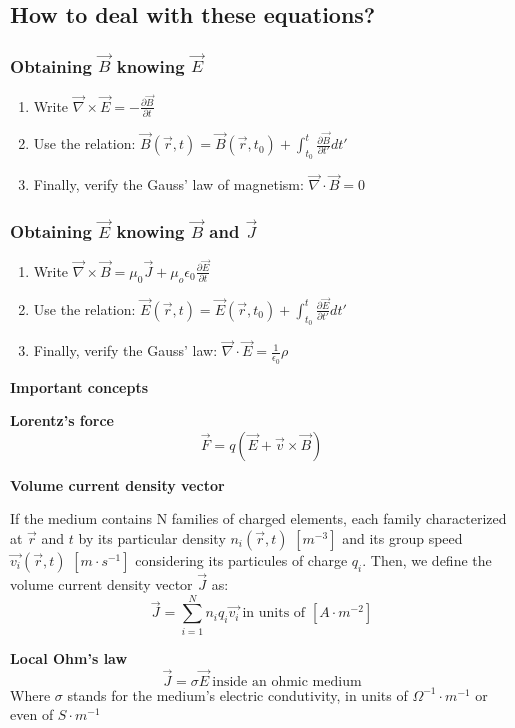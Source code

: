 \documentclass[11pt]{article}
\theoremstyle{definition}
\begin{document}
\subsection{How to deal with these equations?}
\subsubsection{Obtaining $\vec{B}$ knowing $\vec{E}$}
\begin{enumerate}[label=(\roman*)]
    \item Write $\vec{\nabla} \times \vec{E} = -\frac{\partial \vec{B}}{\partial t}$
    \item Use the relation: $\vec{B}(\vec{r},t) = \vec{B}(\vec{r},t_0) + \int_{t_0}^{t} \frac{\partial \vec{B}}{\partial t'}dt'$
    \item Finally, verify the Gauss' law of magnetism: $\vec{\nabla} \cdot \vec{B} = 0$
\end{enumerate}

\subsubsection{Obtaining $\vec{E}$ knowing $\vec{B}$ and $\vec{J}$}
\begin{enumerate}[label=(\roman*)]
    \item Write $\vec{\nabla} \times \vec{B} = \mu_0 \vec{J} + \mu_o \epsilon_0 \frac{\partial \vec{E}}{\partial t}$
    \item Use the relation: $\vec{E}(\vec{r},t) = \vec{E}(\vec{r},t_0) + \int_{t_0}^{t} \frac{\partial \vec{E}}{\partial t'}dt'$
    \item Finally, verify the Gauss' law: $\vec{\nabla} \cdot \vec{E} = \frac{1}{\epsilon_{0}}\rho$
\end{enumerate}

\begin{shaded}
\textbf{Important concepts}

    \textbf{Lorentz's force}
    \begin{equation}
        \vec{F} = q\left(\vec{E}+\vec{v} \times \vec{B}\right)
    \end{equation}

    \textbf{Volume current density vector}
    
    If the medium contains N families of charged elements, each family characterized at $\vec{r}$ and $t$ by its particular
    density $n_{i}\left(\vec{r},t\right)$ $[m^{-3}]$ and its group speed $\vec{v_{i}}(\vec{r},t)$ $[m\cdot s^{-1}]$ considering its particules of charge $q_{i}$.
    Then, we define the volume current density vector $\vec{J}$ as:
    \begin{equation}
        \vec{J} = \sum_{i=1}^{N} n_{i}q_{i}\vec{v_{i}}\ \text{in units of $[A\cdot m^{-2}]$}
    \end{equation}

    \textbf{Local Ohm's law}
    \begin{equation}
        \vec{J} = \sigma \vec{E}\ \text{inside an ohmic medium}
    \end{equation}
    Where $\sigma$ stands for the medium's electric condutivity, in units of $\Omega^{-1} \cdot m^{-1}$ or even of $S \cdot m^{-1}$
\end{shaded}
\end{document}
